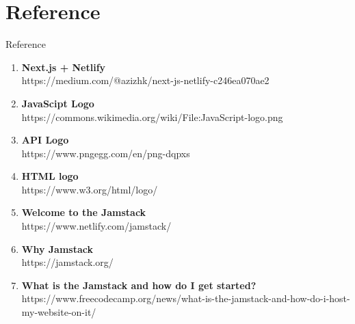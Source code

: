 \documentclass[aspectratio=169,9pt]{beamer}
\begin{document}
\section{Reference}
\begin{frame}{Reference}
    \begin{footnotesize}
    \begin{enumerate}
        \item\textbf{ Next.js + Netlify}\\ https://medium.com/@azizhk/next-js-netlify-c246ea070ae2
        \item \textbf{JavaScipt Logo\\ }https://commons.wikimedia.org/wiki/File:JavaScript-logo.png
        \item \textbf{API Logo} \\https://www.pngegg.com/en/png-dqpxs
        \item \textbf{HTML logo} \\https://www.w3.org/html/logo/
        \item \textbf{Welcome to the Jamstack} \\https://www.netlify.com/jamstack/
        \item \textbf{Why Jamstack} \\https://jamstack.org/
        \item \textbf{What is the Jamstack and how do I get started? }https://www.freecodecamp.org/news/what-is-the-jamstack-and-how-do-i-host-my-website-on-it/
    \end{enumerate}
    \end{footnotesize}
\end{frame}
\end{document}
